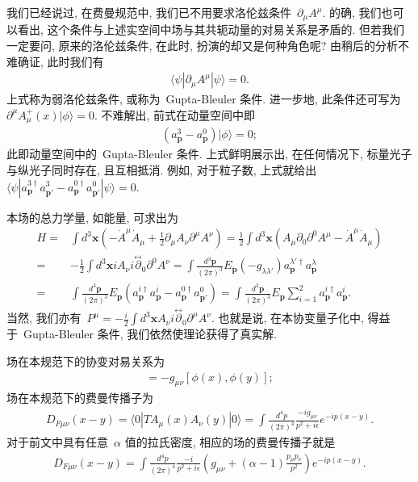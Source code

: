 我们已经说过, 在费曼规范中, 我们已不用要求洛伦兹条件~$\partial_\mu A^\mu$. 的确, 我们也可以看出, 这个条件与上述实空间中场与其共轭动量的对易关系是矛盾的. 但若我们一定要问, 原来的洛伦兹条件, 在此时, 扮演的却又是何种角色呢? 由稍后的分析不难确证, 此时我们有
\begin{align}
\langle\psi|\partial_\mu A^\mu|\psi\rangle=0.
\end{align}
上式称为弱洛伦兹条件, 或称为~Gupta-Bleuler 条件. 进一步地, 此条件还可写为~$\partial^\mu A^+_\mu(x)|\phi\rangle=0$. 不难解出, 前式在动量空间中即
\begin{align}
\left(a_{\bm{p}}^3-a_{\bm{p}}^0\right)|\phi\rangle=0;
\end{align}
此即动量空间中的~Gupta-Bleuler 条件. 上式鲜明展示出, 在任何情况下, 标量光子与纵光子同时存在, 且互相抵消. 例如, 对于粒子数, 上式就给出~$\langle\psi|a^{3\dag}_{\bm{p}}a^3_{\bm{p}'}-a^{0\dag}_{\bm{p}}a^0_{\bm{p}'}|\psi\rangle=0$.


本场的总力学量, 如能量, 可求出为
\begin{align}
H=&\int d^3\bm{x}\left(-\dot{A}^\mu \dot{A}_\mu+\frac{1}{2}\partial_\mu A_\nu\partial^\mu A^\nu\right)=\frac{1}{2}\int d^3\bm{x}\left(A_\mu\partial_0\partial^0A^\mu-\dot{A}^\mu \dot{A}_\mu\right)\nonumber\\
=&-\frac{1}{2}\int d^3\bm{x}iA_\nu i\overset{\leftrightarrow}{\partial}_0\partial^0A^\nu=\int\frac{d^3\bm{p}}{(2\pi)^3}E_{\bm{p}}\left(-g_{\lambda\lambda'}\right)a^{\lambda'\dag}_{\bm{p}}a^{\lambda}_{\bm{p}}\nonumber\\
=&\int\frac{d^3\bm{p}}{(2\pi)^3}E_{\bm{p}}(a^{i\dag}_{\bm{p}}a^i_{\bm{p}}-a^{0\dag}_{\bm{p}}a^0_{\bm{p}'})=\int\frac{d^3\bm{p}}{(2\pi)^3}E_{\bm{p}}\sum_{i=1}^2a^{i\dag}_{\bm{p}}a^i_{\bm{p}}.
\end{align}
当然, 我们亦有~$P^\mu=-\frac{i}{2}\int d^3\bm{x}A_\nu i\overset{\leftrightarrow}{\partial}_0\partial^\mu A^\nu$. 也就是说, 在本协变量子化中, 得益于~Gupta-Bleuler 条件, 我们依然使理论获得了真实解.






场在本规范下的协变对易关系为
\begin{align}
[A_\mu(x),A_\nu(y)]=-g_{\mu\nu}[\phi(x),\phi(y)];
\end{align}
场在本规范下的费曼传播子为
\begin{align}
D_{F\mu\nu}(x-y)=\langle0|TA_\mu(x)A_\nu(y)|0\rangle=\int\frac{d^4p}{(2\pi)^4}\frac{-ig_{\mu\nu}}{p^2+i\epsilon}e^{-ip(x-y)}.
\end{align}
对于前文中具有任意~$\alpha$ 值的拉氏密度, 相应的场的费曼传播子就是
\begin{align}
D_{F\mu\nu}(x-y)=\int\frac{d^4p}{(2\pi)^4}\frac{-i}{p^2+i\epsilon}\left(g_{\mu\nu}+(\alpha-1)\frac{p_\mu p_\nu}{p^2}\right)e^{-ip(x-y)}.
\end{align}






